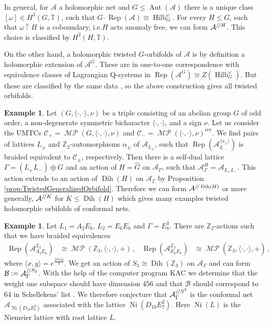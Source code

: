 \documentclass[twoside,11pt,reqno]{amsart}
\makeatletter
\theoremstyle{definition}
\newtheorem{example}[thm]{Example}
\theoremstyle{remark}
\newcommand{\cB}{\mathcal{B}}
\newcommand{\cC}{\mathcal{C}}
\newcommand{\A}{\mathcal{A}}
\newcommand{\TT}{\mathbb{T}}
\newcommand{\ZZ}{\mathbb{Z}}
\DeclareMathOperator{\Rep}{Rep}
\DeclareMathOperator{\Aut}{Aut}
\DeclareRobustCommand{\ie}{i.e.\@\xspace}
\DeclareMathOperator{\Ni}{Ni}
\DeclareMathOperator{\Dih}{Dih}
\DeclareMathOperator*{\MP}{\mathcal{MP}}
\DeclareMathOperator{\Vect}{Hilb}
\newcommand{\tRep}[1]{#1\text{--}\Rep}
\newcommand{\bi}[2]{\langle #1,#2\rangle}
\newcommand{\rev}[1]{{#1}^\mathrm{rev}}
\newcommand{\bislotslot}{\bi\cdot\cdot}
\newcommand{\lattimes}{}%
\makeatother
\begin{document}
In general, for $\A$ a holomorphic net and $G\leq \Aut(\A)$ there is a unique
class $[\omega]\in H^3(G,\TT)$, such that $\tRep G(\A)\cong \Vect_G^\omega$.
For every $H\leq G$, such that $\omega\restriction H$ is a coboundary, \ie $H$ 
acts anomaly free, we can form $\A^{\TO H}$.
This choice is classified by $H^2(H,\TT)$.

On the other hand, a holomorphic twisted $G$-orbifolds of $\A$ is by definition
a holomorphic extension of $\A^G$.
These are in one-to-one correspondence with equivalence classes of 
Lagrangian Q-systems in $\Rep(\A^G)\cong Z(\Vect^\omega_G)$. 
But these are classified by the same data \cite{DaSi2017}, so the above 
construction gives all twisted orbifolds.

\begin{example}
  Let $(G,\bislotslot,\nu)$ be a triple consisting of an abelian group $G$ 
  of odd order, a non-degenerate symmetric bicharacter $\bislotslot$, 
  and a sign $\nu$.
  Let us consider the UMTCs $\cC_+=\MP(G,\bislotslot,\nu)$ and 
  $\cC_-=\rev{\MP(\bislotslot,\nu)}$.
  We find pairs of lattices $L_\pm$ and $\ZZ_2$-automorphisms $\alpha_\pm$ of 
  $\A_{L_\pm}$, such that $\Rep(\A_L^{\langle\alpha_\pm\rangle})$ is braided 
  equivalent to $\cC_\pm$, respectively. 
  Then there is a self-dual lattice $\Gamma=(L_+\lattimes L_-)\oplus G$ and an 
  action of $H=\hat G$ on $\A_\Gamma$, such that 
  $\A^H_\Gamma=\A_{L_+\lattimes L_-}$.
  This action extends to an action of $\Dih(H)$ on $\A_\Gamma$ by 
  Proposition \ref{prop:TwistedGeneralizedOrbifold}.
  Therefore we can form $\A^{\TO\Dih(H)}$ or more generally, $\A^{\TO K}$ for 
  $K\leq \Dih(H)$ which gives many examples twisted holomorphic orbifolds
  of conformal nets.
\end{example}
\begin{example}
  Let $L_1=A_2E_8$, $L_2=E_6E_8$ and $\Gamma=E_8^3$.
  There are $\ZZ_2$-actions such that we have braided equivalences
  \begin{align}
    \Rep(\A_{A_2E_8}^{\ZZ_2})&\cong \MP(\ZZ_3,\bislotslot,+)\,,&
    \Rep(\A_{E_6E_8}^{\ZZ_2})&\cong \MP(\ZZ_3,\overline{\bislotslot},+)\,,
  \end{align}
  where $\bi xy =e^{\frac{2\pi ixy}3}$. 
  We get an action of $S_3\cong \Dih(\ZZ_3)$ on $\A_{\Gamma}$ and can form 
  $\cB:=\A_{\Gamma}^{\TO S_3}$. 
  With the help of the computer program KAC \cite{ScKAC} we determine that the 
  weight one subspace should have dimension $456$ and that 
  $\cB$ should correspond to 64 in Schellekens' list 
  \cite{Sc1993}. 
  We therefore conjecture that $\A_{\Gamma}^{\TO S^3}$ is the  conformal net 
  $\A_{\Ni(D_{10}E_7^2)}$ associated with the lattice $\Ni(D_{10}E_7^2)$. 
  Here $\Ni(L)$ is the Niemeier lattice \cite{Ni1973} with root lattice $L$.
\end{example}
\end{document}
